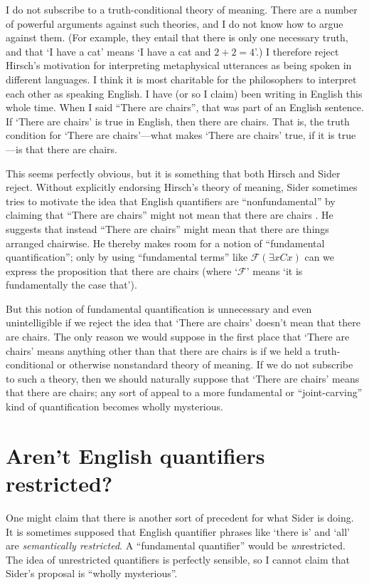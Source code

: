 \documentclass[11pt]{article}
\begin{document}
\begin{spacing}{1.25}
I do not subscribe to a truth-conditional theory of meaning.  There
are a number of powerful arguments against such theories, and I do not
know how to argue against them.  (For example, they entail that there
is only one necessary truth, and that `I have a cat' means `I have a
cat and $2 + 2 = 4$'.)  I therefore reject Hirsch's motivation for
interpreting metaphysical utterances as being spoken in different
languages.  I think it is most charitable for the philosophers to
interpret each other as speaking English.  I have (or so I claim) been
writing in English this whole time.  When I said ``There are chairs'',
that was part of an English sentence.  If `There are chairs' is true
in English, then there are chairs.  That is, the truth condition for
`There are chairs'---what makes `There are chairs' true, if it is
true---is that there are chairs.

This seems perfectly obvious, but it is something that both Hirsch and
Sider reject.  Without explicitly endorsing Hirsch's theory of
meaning, Sider sometimes tries to motivate the idea that English
quantifiers are ``nonfundamental'' by claiming that ``There are
chairs'' might not mean that there are chairs
\citeyearpar[171]{sider2011d}.  He suggests that instead ``There are
chairs'' might mean that there are things arranged chairwise.  He
thereby makes room for a notion of ``fundamental quantification'';
only by using ``fundamental terms'' like $\mathcal{F} ( \exists x Cx
)$ can we express the proposition that there are chairs (where
`$\mathcal{F}$' means `it is fundamentally the case that').

But this notion of fundamental quantification is unnecessary and even
unintelligible if we reject the idea that `There are chairs' doesn't
mean that there are chairs.  The only reason we would suppose in the
first place that `There are chairs' means anything other than that
there are chairs is if we held a truth-conditional or otherwise
nonstandard theory of meaning.  If we do not subscribe to such a
theory, then we should naturally suppose that `There are chairs' means
that there are chairs; any sort of appeal to a more fundamental or
``joint-carving'' kind of quantification becomes wholly mysterious.

\section{Aren't English quantifiers restricted?}
\label{eng-quant}
One might claim that there is another sort of precedent for what Sider
is doing.  It is sometimes supposed that English quantifier phrases
like `there is' and `all' are {\em semantically restricted}.  A
``fundamental quantifier'' would be {\em un}restricted.  The idea of
unrestricted quantifiers is perfectly sensible, so I cannot claim that
Sider's proposal is ``wholly mysterious''.


\end{spacing}
\end{document}
